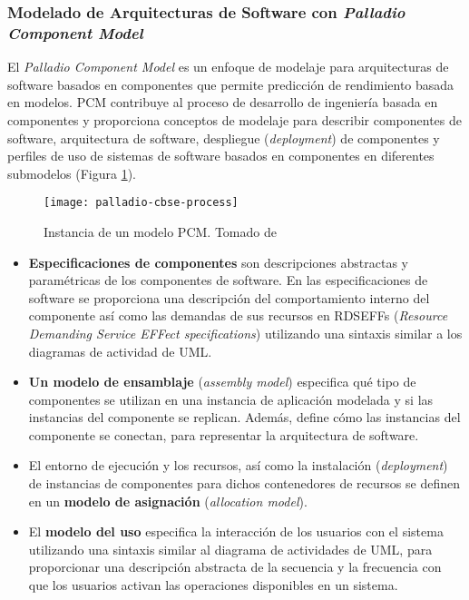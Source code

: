 \subsubsection{Modelado de Arquitecturas de Software con \emph{Palladio Component Model}} \label{sec:pcm}
El \emph{Palladio Component Model} es un enfoque de modelaje para arquitecturas de software basados en componentes que permite predicción de rendimiento basada en modelos. PCM contribuye al proceso de desarrollo de ingeniería basada en componentes y proporciona conceptos de modelaje para describir componentes de software, arquitectura de software, despliegue (\emph{deployment}) de componentes y perfiles de uso de sistemas de software basados en componentes en diferentes submodelos (Figura \ref{fig:pcm-instance}). 

\begin{figure}[h]
  \centering
  \texttt{[image: palladio-cbse-process]}
  \caption[Instancia de un modelo PCM]{Instancia de un modelo PCM. Tomado de \protect\cite{Becker:2009:PCM:1458724.1458819}}
  \label{fig:pcm-instance}
\end{figure}

\begin{itemize}
    \item \textbf{Especificaciones de componentes} son descripciones abstractas y paramétricas de los componentes de software. En las especificaciones de software se proporciona una descripción del comportamiento interno del componente así como las demandas de sus recursos en RDSEFFs (\emph{Resource Demanding Service EFFect specifications}) utilizando una sintaxis similar a los diagramas de actividad de UML.
    \item \textbf{Un modelo de ensamblaje} (\emph{assembly model}) especifica qué tipo de componentes se utilizan en una instancia de aplicación modelada y si las instancias del componente se replican. Además, define cómo las instancias del componente se conectan, para representar la arquitectura de software.
    \item El entorno de ejecución y los recursos, así como la instalación (\emph{deployment}) de instancias de componentes para dichos contenedores de recursos se definen en un \textbf{modelo de asignación} (\emph{allocation model}).
    \item El \textbf{modelo del uso} especifica la interacción de los usuarios con el sistema utilizando una sintaxis similar al diagrama de actividades de UML, para proporcionar una descripción abstracta de la secuencia y la frecuencia con que los usuarios activan las operaciones disponibles en un sistema.
\end{itemize}

